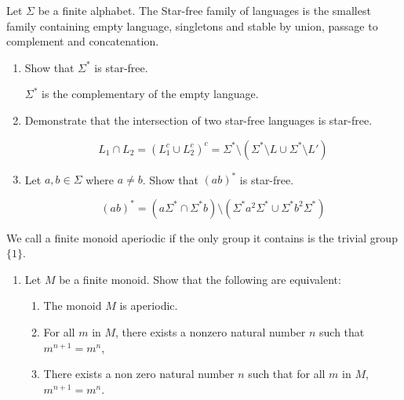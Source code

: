 \documentclass[a4paper,11pt]{exam}
\begin{document}
\begin{questions}
Let $\Sigma$ be a finite alphabet.
The Star-free  family of languages is the smallest family containing empty language, singletons and stable by union, passage to complement and concatenation.
  \begin{enumerate}
  	 \item Show that $\Sigma^*$ is star-free.
  	
  	\begin{solution}
  		$\Sigma^*$ is the complementary of the empty language.
  	\end{solution}
    \item Demonstrate that the intersection of two star-free languages is star-free.
      \begin{solution}
        \[
          L_1 \cap L_2 =(L_1^c\cup L_2^c)^c =  \Sigma^* \setminus
          (\Sigma^* \setminus L \cup \Sigma^* \setminus L')
        \]
      \end{solution}

    \item Let $a,b \in\Sigma$ where $a\neq b$. Show that $(ab)^*$ is star-free.

      \begin{solution}
        \[
          (ab)^*=(a\Sigma^* \cap \Sigma^*b) \setminus 
          (\Sigma^* a^2 \Sigma^* \cup \Sigma^* b^2 \Sigma^*)
        \]
      \end{solution}
  \end{enumerate}

  
  We call a finite monoid aperiodic if the only group it contains is the trivial group $\{1\}$.
  \begin{enumerate}[resume]
    \item Let $M$ be a finite monoid.
      Show that the following are equivalent:
      \begin{enumerate}
        \item The monoid $M$ is aperiodic.
        \item For all $m$ in $M$, there exists a nonzero natural number $n$  such that $m^{n+1} = m^n$,
        \item There exists a non zero natural number $n$ such that for all $m$ in $M$, $m^{n+1} = m^n$.
      \end{enumerate}


\end{enumerate}
\end{questions}
\end{document}
